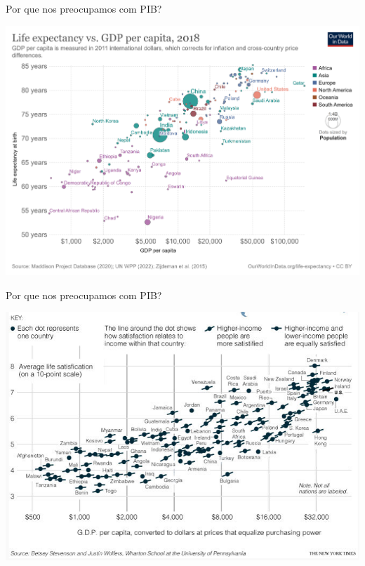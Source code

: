 \documentclass[10pt]{beamer}
\begin{document}
\begin{frame}{Por que nos preocupamos com PIB?}
    \begin{center}
        \begin{minipage}[b]{.7\textwidth}
            \href{https://ourworldindata.org/grapher/life-expectancy-vs-gdp-per-capita}{\includegraphics[width=\textwidth]{./figures/life exp x gdp.png}}
        \end{minipage}
    \end{center}
\end{frame}

\begin{frame}{Por que nos preocupamos com PIB?}
    \begin{center}
        \begin{minipage}[b]{.7\textwidth}
            \href{https://www.nytimes.com/2008/04/16/business/16leonhardt.html}{\includegraphics[width=\textwidth]{./figures/gdp x satisfaction.PNG}}
        \end{minipage}
    \end{center}
\end{frame}
\end{document}
